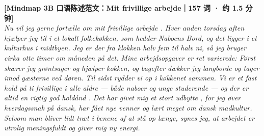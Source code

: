 \begin{transbox}
\small
\textbf{\color{NCDNavy}[Mindmap 3B 口语陈述范文：Mit frivillige arbejde｜157 词 · 约 1.5 分钟]}\\
\textit{Nu vil jeg gerne fortælle om mit frivillige arbejde . Hver anden torsdag aften hjælper jeg til i et lokalt folkekøkken, som hedder Naboens Bord, og det ligger i et kulturhus i midtbyen. Jeg er der fra klokken halv fem til halv ni, så jeg bruger cirka otte timer om måneden på det. Mine arbejdsopgaver  er ret varierede: Først skærer jeg grøntsager og hjælper kokken, og bagefter dækker jeg langborde og tager imod gæsterne ved døren. Til sidst rydder vi op i køkkenet sammen. Vi er et fast hold på ti frivillige i alle aldre --- både naboer og unge studerende --- og der er altid en rigtig god holdånd . Det har givet mig et stort udbytte , for jeg øver hverdagssnak på dansk, har fået nye venner og lært meget om dansk madkultur. Selvom man bliver lidt træt i benene af at stå op længe, synes jeg, at arbejdet er utrolig meningsfuldt  og giver mig ny energi.}
\end{transbox}


